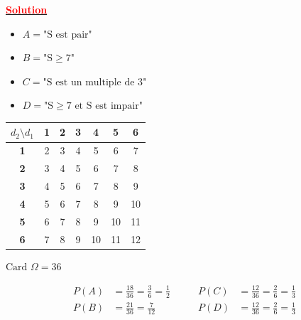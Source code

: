 \documentclass[12pt,a4paper]{article}
\begin{document}
\underline{\textbf{\textcolor{red}{Solution}}}\\
\begin{itemize}
    \item $A = \text{"S est pair"}$
    \item $B = \text{"S} \geqslant 7\text{"}$
    \item $C = \text{"S est un multiple de 3"}$
    \item $D = \text{"S} \geqslant 7 \text{ et S est impair"}$
\end{itemize}

\begin{center}
\begin{tabular}{|c|c|c|c|c|c|c|}
\hline
$d_2 \setminus d_1$ & \textbf{1} & \textbf{2} & \textbf{3} & \textbf{4} & \textbf{5} & \textbf{6} \\ \hline
\textbf{1} & 2 & 3 & 4 & 5 & 6 & 7 \\ \hline
\textbf{2} & 3 & 4 & 5 & 6 & 7 & 8 \\ \hline
\textbf{3} & 4 & 5 & 6 & 7 & 8 & 9 \\ \hline
\textbf{4} & 5 & 6 & 7 & 8 & 9 & 10 \\ \hline
\textbf{5} & 6 & 7 & 8 & 9 & 10 & 11 \\ \hline
\textbf{6} & 7 & 8 & 9 & 10 & 11 & 12 \\ \hline
\end{tabular}
\end{center}

$\text{Card } \Omega = 36$

\begin{align*}
    P(A) &= \frac{18}{36} = \frac{3}{6} = \frac{1}{2} \qquad & P(C) &= \frac{12}{36} = \frac{2}{6} = \frac{1}{3} \\
    P(B) &= \frac{21}{36} = \frac{7}{12} \qquad & P(D) &= \frac{12}{36} = \frac{2}{6} = \frac{1}{3}
\end{align*}
\end{document}
